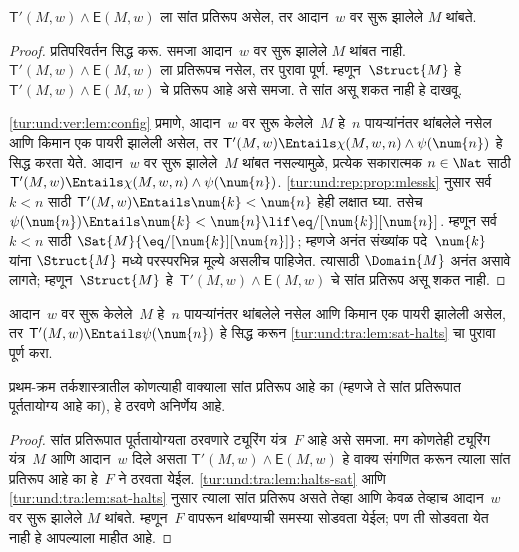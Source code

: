 \begin{lem}\label{tur:und:tra:lem:sat-halts}
  $\mathsf{T}'(M,w) \land \mathsf{E}(M,w)$
  ला सांत प्रतिरूप
  असेल, तर आदान~$w$
  वर सुरू झालेले
  $M$ थांबते.
\end{lem}

\begin{proof}
  प्रतिपरिवर्तन सिद्ध करू.
  समजा आदान~$w$
  वर सुरू झालेले
  $M$ थांबत नाही.
  $\mathsf{T}'(M,w) \land \mathsf{E}(M,w)$
  ला प्रतिरूपच नसेल,
  तर पुरावा पूर्ण.
  म्हणून~$\Struct{M}$
  हे~$\mathsf{T}'(M,w) \land \mathsf{E}(M, w)$
  चे प्रतिरूप आहे
  असे समजा. ते
  सांत असू शकत
  नाही हे दाखवू.


  \ref{tur:und:ver:lem:config}
  प्रमाणे, आदान~$w$
  वर सुरू केलेले~$M$
  हे~$n$ पायऱ्यांनंतर
  थांबलेले नसेल आणि
  किमान एक पायरी
  झालेली असेल, तर
  $\mathsf{T}'(M,w)
  \Entails \chi(M, w, n) \land \psi(\num{n})$
  हे सिद्ध करता येते.
  आदान~$w$ वर
  सुरू झालेले~$M$
  थांबत नसल्यामुळे,
  प्रत्येक सकारात्मक
  $n \in \Nat$ साठी
  $\mathsf{T}'(M,w) \Entails \chi(M, w, n) \land
  \psi(\num{n})$.
  \ref{tur:und:rep:prop:mlessk}
  नुसार सर्व~$k < n$
  साठी $\mathsf{T}'(M,w) \Entails \num{k} < \num{n}$
  हेही लक्षात घ्या.
  तसेच $\psi(\num{n})
  \Entails \num{k} < \num{n} \lif
  \eq/[\num{k}][\num{n}]$.
  म्हणून सर्व~$k < n$
  साठी $\Sat{M}{\eq/[\num{k}][\num{n}]}$;
  म्हणजे अनंत संख्यांक
  पदे~$\num{k}$ यांना
  $\Struct{M}$ मध्ये
  परस्परभिन्न मूल्ये
  असलीच पाहिजेत.
  त्यासाठी $\Domain{M}$
  अनंत असावे लागते;
  म्हणून~$\Struct{M}$
  हे~$\mathsf{T}'(M,w) \land \mathsf{E}(M, w)$
  चे सांत प्रतिरूप
  असू शकत नाही.

\end{proof}

\begin{prob}
  आदान~$w$ वर
  सुरू केलेले~$M$
  हे~$n$ पायऱ्यांनंतर
  थांबलेले नसेल आणि
  किमान एक पायरी
  झालेली असेल,
  तर $\mathsf{T}'(M,w) \Entails \psi(\num{n})$
  हे सिद्ध करून
  \ref{tur:und:tra:lem:sat-halts}
  चा पुरावा पूर्ण करा.
\end{prob}

\begin{thm}[ट्राख्टेनब्रोटचे प्रमेय]
  \label{tur:und:tra:thm:trakhtenbrodt}
  प्रथम-क्रम तर्कशास्त्रातील
  कोणत्याही वाक्याला सांत प्रतिरूप
  आहे का (म्हणजे ते
  सांत प्रतिरूपात पूर्ततायोग्य आहे का),
  हे ठरवणे अनिर्णेय आहे.
\end{thm}

\begin{proof}
  सांत प्रतिरूपात पूर्ततायोग्यता ठरवणारे
  ट्यूरिंग यंत्र~$F$
  आहे असे समजा.
  मग कोणतेही ट्यूरिंग
  यंत्र~$M$ आणि
  आदान~$w$ दिले असता
  $\mathsf{T}'(M,w) \land \mathsf{E}(M,w)$
  हे वाक्य संगणित करून
  त्याला सांत प्रतिरूप
  आहे का हे~$F$
  ने ठरवता येईल.
  \ref{tur:und:tra:lem:halts-sat} आणि \ref{tur:und:tra:lem:sat-halts}
  नुसार त्याला सांत
  प्रतिरूप असते तेव्हा आणि केवळ तेव्हाच
  आदान~$w$ वर
  सुरू झालेले $M$
  थांबते. म्हणून~$F$
  वापरून थांबण्याची
  समस्या सोडवता येईल;
  पण ती सोडवता येत
  नाही हे आपल्याला
  माहीत आहे.
\end{proof}


